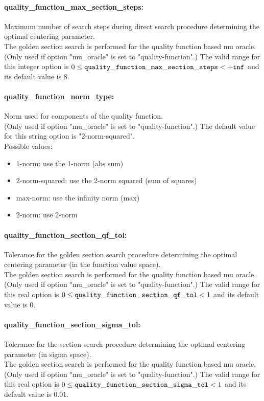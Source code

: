 \paragraph{quality\_function\_max\_section\_steps:}\label{opt:quality_function_max_section_steps} Maximum number of search steps during direct search procedure determining the optimal centering parameter. \\
 The golden section search is performed for the quality function based mu oracle. (Only used if option "mu\_oracle" is set to "quality-function".) The valid range for this integer option is
$0 \le {\tt quality\_function\_max\_section\_steps } <  {\tt +inf}$
and its default value is $8$.


\paragraph{quality\_function\_norm\_type:}\label{opt:quality_function_norm_type} Norm used for components of the quality function. \\
 (Only used if option "mu\_oracle" is set to "quality-function".) The default value for this string option is "2-norm-squared".
\\ 
Possible values:
\begin{itemize}
   \item 1-norm: use the 1-norm (abs sum)
   \item 2-norm-squared: use the 2-norm squared (sum of squares)
   \item max-norm: use the infinity norm (max)
   \item 2-norm: use 2-norm
\end{itemize}

\paragraph{quality\_function\_section\_qf\_tol:}\label{opt:quality_function_section_qf_tol} Tolerance for the golden section search procedure determining the optimal centering parameter (in the function value space). \\
 The golden section search is performed for the quality function based mu oracle. (Only used if option "mu\_oracle" is set to "quality-function".) The valid range for this real option is 
$0 \le {\tt quality\_function\_section\_qf\_tol } <  1$
and its default value is $0$.


\paragraph{quality\_function\_section\_sigma\_tol:}\label{opt:quality_function_section_sigma_tol} Tolerance for the section search procedure determining the optimal centering parameter (in sigma space). \\
 The golden section search is performed for the quality function based mu oracle. (Only used if option "mu\_oracle" is set to "quality-function".) The valid range for this real option is 
$0 \le {\tt quality\_function\_section\_sigma\_tol } <  1$
and its default value is $0.01$.


